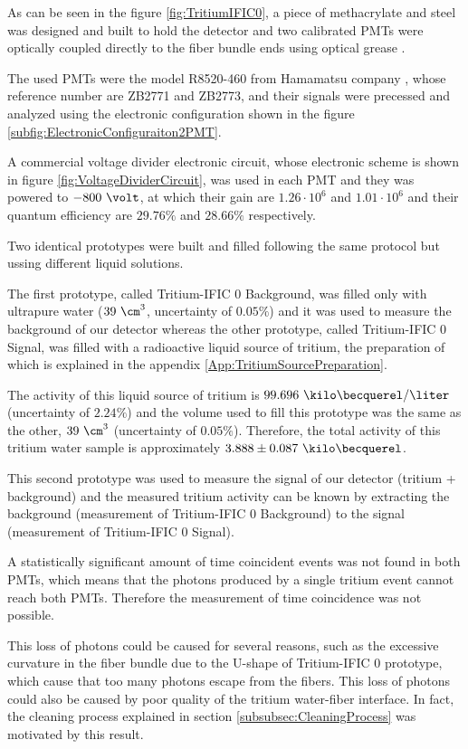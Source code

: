 As can be seen in the figure \ref{fig:TritiumIFIC0}, a piece of methacrylate and steel was designed and built to hold the detector and two calibrated PMTs were optically coupled directly to the fiber bundle ends using optical grease \cite{OpticalGrease}.

The used PMTs were the model R8520-460 from Hamamatsu company \cite{DataSheetPMTs}, whose reference number are ZB2771 and ZB2773, and their signals were precessed and analyzed using the electronic configuration shown in the figure \ref{subfig:ElectronicConfiguraiton2PMT}.

A commercial voltage divider electronic circuit, whose electronic scheme is shown in figure \ref{fig:VoltageDividerCircuit}, was used in each PMT and they was powered to $-800~\volt$, at which their gain are $1.26 \cdot{} 10^6$ and $1.01 \cdot{} 10^6$ and their quantum efficiency are $29.76\%$ and $28.66\%$ respectively.

Two identical prototypes were built and filled following the same protocol but ussing different liquid solutions. 

The first prototype, called Tritium-IFIC 0 Background, was filled only with  ultrapure water ($39~\cm^3$, uncertainty of $0.05\%$) and it was used to measure the background of our detector whereas the other prototype, called Tritium-IFIC 0 Signal, was filled with a radioactive liquid source of tritium, the preparation of which is explained in the appendix \ref{App:TritiumSourcePreparation}.

The activity of this liquid source of tritium is $99.696~\kilo\becquerel/\liter$ (uncertainty of $2.24\%$) and the volume used to fill this prototype was the same as the other, $39~\cm^3$ (uncertainty of $0.05\%$). Therefore, the total activity of this tritium water sample is approximately $3.888 \pm 0.087~\kilo\becquerel$. 

This second prototype was used to measure the signal of our detector (tritium + background) and the measured tritium activity can be known by extracting the background (measurement of Tritium-IFIC 0 Background) to the signal (measurement of Tritium-IFIC 0 Signal).

A statistically significant amount of time coincident events was not found in both PMTs, which means that the photons produced by a single tritium event cannot reach both PMTs. Therefore the measurement of time coincidence was not possible. 

This loss of photons could be caused for several reasons, such as the excessive curvature in the fiber bundle due to the U-shape of Tritium-IFIC 0 prototype, which cause that too many photons escape from the fibers. This loss of photons could also be caused by poor quality of the tritium water-fiber interface. In fact, the cleaning process explained in section \ref{subsubsec:CleaningProcess} was motivated by this result.

